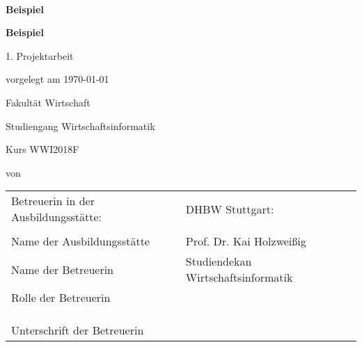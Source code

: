 \newcommand{\typMeinerArbeit}{1. Projektarbeit} 

\newcommand{\themaMeinerArbeit}{Beispiel}
\newcommand{\unterThemaMeinerArbeit}{Beispiel}

\newcommand{\autorDerArbeit}{}

\thispagestyle{empty}

\begin{spacing}{1}
\begin{center}	
~\vspace{0mm}

{\sffamily
\LARGE  
\textbf{\themaMeinerArbeit}

\bigskip
\textbf{\unterThemaMeinerArbeit}
}


\vspace{15mm}

{\Large \typMeinerArbeit}

\vspace{1cm}

vorgelegt am \today 

\vspace{15mm}

Fakultät Wirtschaft
\medskip

Studiengang Wirtschaftsinformatik
\medskip

Kurs WWI2018F 

\vspace{10mm}

von

\vspace{10mm}

{\large\textsc{\autorDerArbeit}}

\vspace{10mm}
\end{center}

\vfill

\begin{tabular}{ll}
Betreuerin in der Ausbildungsstätte: & DHBW Stuttgart: \\
\hspace{0.4\linewidth} & \\
Name der Ausbildungsstätte & Prof. Dr. Kai Holzweißig \\
Name der Betreuerin 
& Studiendekan Wirtschaftsinformatik \\
Rolle der Betreuerin \\
\\
\\
\\
Unterschrift der Betreuerin \\
\end{tabular}


\vspace{1cm}

\end{spacing}

